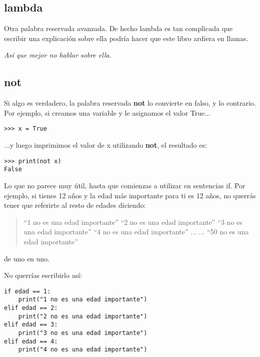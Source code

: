 \begin{listing}
\subsection*{lambda}

Otra palabra reservada avanzada. De hecho lambda es tan complicada que escribir una explicación sobre ella podría hacer que este libro ardiera en llamas.
\par
\emph{Así que mejor no hablar sobre ella.}

\subsection*{not}

Si algo es verdadero, la palabra reservada \textbf{not} lo convierte en falso, y lo contrario.  Por ejemplo, si creamos una variable  y le asignamos el valor True...

\begin{listing}
\begin{verbatim}
>>> x = True
\end{verbatim}
\end{listing}

...y luego imprimimos el valor de x utilizando \textbf{not}, el resultado es:

\begin{listing}
\begin{verbatim}
>>> print(not x)
False
\end{verbatim}
\end{listing}

Lo que no parece muy útil, hasta que comienzas a utilizar  en sentencias if.  Por ejemplo, si tienes 12 años y la edad más importante para ti es 12 años, no querrás tener que referirte al resto de edades diciendo:

\begin{quotation}
``1 no es una edad importante''
``2 no es una edad importante''
``3 no es una edad importante''
``4 no es una edad importante''
...
...
``50 no es una edad importante''
\end{quotation}

de uno en uno.
\par\noindent
No querrías escribirlo así:

\begin{listing}
\begin{verbatim}
if edad == 1:
    print("1 no es una edad importante")
elif edad == 2:
    print("2 no es una edad importante")
elif edad == 3:
    print("3 no es una edad importante")
elif edad == 4:
    print("4 no es una edad importante")
\end{verbatim}
\end{listing}


\end{listing}
